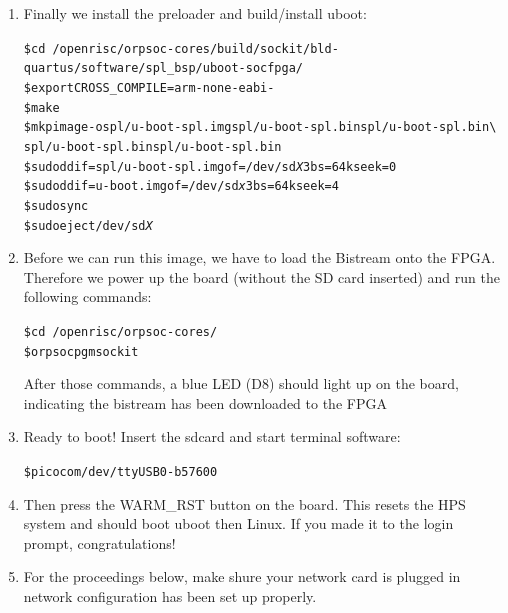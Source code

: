 \documentclass[twoside]{article}
\begin{document}
\begin{enumerate}
\item Finally we install the preloader and build/install uboot:
  \begin{alltt}
\$ cd ~/openrisc/orpsoc-cores/build/sockit/bld-quartus/software/spl_bsp/uboot-socfpga/
\$ export CROSS_COMPILE=arm-none-eabi-
\$ make
\$ mkpimage -o spl/u-boot-spl.img spl/u-boot-spl.bin spl/u-boot-spl.bin \textbackslash
               spl/u-boot-spl.bin spl/u-boot-spl.bin
\$ sudo dd if=spl/u-boot-spl.img of=/dev/sd\emph{X}3 bs=64k seek=0
\$ sudo dd if=u-boot.img of=/dev/sd\emph{x}3 bs=64k seek=4
\$ sudo sync
\$ sudo eject /dev/sd\emph{X}    
  \end{alltt}

\item Before we can run this image, we have to load the Bistream onto
  the FPGA. Therefore we power up the board (without the SD card
  inserted) and run the following commands:
  \begin{alltt}
\$ cd ~/openrisc/orpsoc-cores/ 
\$ orpsoc pgm sockit
  \end{alltt}
  After those commands, a blue LED (D8) should light up on the board,
  indicating the bistream has been downloaded to the FPGA

\item Ready to boot! Insert the sdcard and start terminal software:
\begin{alltt}
\$ picocom /dev/ttyUSB0 -b 57600
\end{alltt}

\item Then press the WARM\_RST button on the board. This resets the HPS
  system and should boot uboot then Linux. If you made it to the login
  prompt, congratulations!

\item For the proceedings below, make shure your network card is
  plugged in network configuration has been set up properly.
\end{enumerate}
\end{document}
